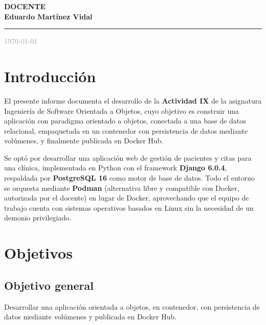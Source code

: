 \documentclass[12pt,a4paper]{article}
\begin{document}
\begin{titlepage}
\begin{minipage}[t]{0.78\textwidth}
        \vspace{1.5cm}

        {\large\textcolor{primaryblue}{\textbf{DOCENTE}}}\\[0.5cm]
        \textbf{Eduardo Martínez Vidal}

        \vfill
        \textcolor{primaryblue}{\rule{0.8\linewidth}{1pt}}
        \vspace{0.3cm}
        {\large\textcolor{darkgray}{\today}}

    \end{minipage}
\end{titlepage}

\newpage
\tableofcontents
\newpage

\section{Introducción}

El presente informe documenta el desarrollo de la \textbf{Actividad IX} de la asignatura Ingeniería de Software Orientada a Objetos, cuyo objetivo es construir una aplicación con paradigma orientado a objetos, conectada a una base de datos relacional, empaquetada en un contenedor con persistencia de datos mediante volúmenes, y finalmente publicada en Docker Hub.

Se optó por desarrollar una aplicación web de gestión de pacientes y citas para una clínica, implementada en Python con el framework \textbf{Django 6.0.4}, respaldada por \textbf{PostgreSQL 16} como motor de base de datos. Todo el entorno se orquesta mediante \textbf{Podman} (alternativa libre y compatible con Docker, autorizada por el docente) en lugar de Docker, aprovechando que el equipo de trabajo cuenta con sistemas operativos basados en Linux sin la necesidad de un demonio privilegiado.

\section{Objetivos}

\subsection{Objetivo general}

Desarrollar una aplicación orientada a objetos, en contenedor, con persistencia de datos mediante volúmenes y publicada en Docker Hub.
\end{document}
